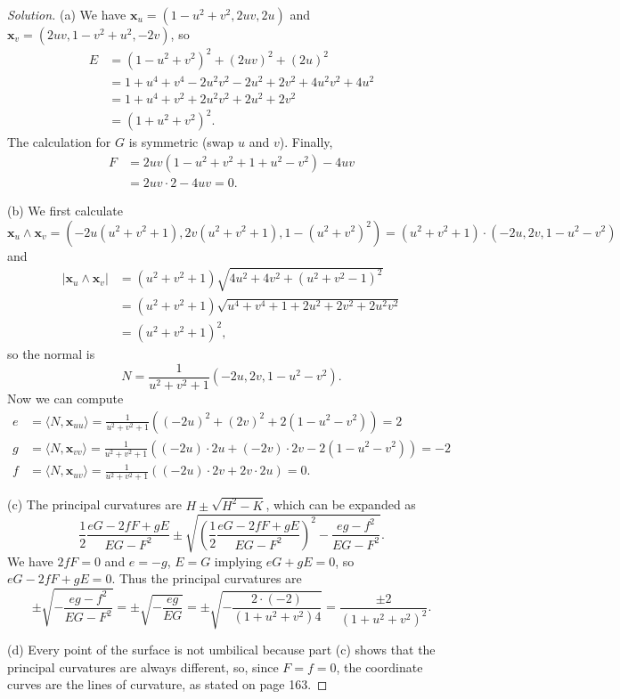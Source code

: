 \documentclass[10pt]{scrartcl}
\providecommand{\half}{\frac{1}{2}}
\providecommand{\mb}[1]{\mathbf{#1}}
\newenvironment{soln}{\begin{proof}[Solution]}{\end{proof}}
\begin{document}
\begin{soln}
	(a) We have $\mb x_u = (1-u^2+v^2,2uv,2u)$
	and $\mb x_v = (2uv,1-v^2+u^2,-2v)$, so
	\begin{align*}
		E &= (1-u^2+v^2)^2 + (2uv)^2 + (2u)^2\\
		&= 1+u^4+v^4-2u^2v^2-2u^2+2v^2+4u^2v^2+4u^2\\
		&= 1+u^4+v^2+2u^2v^2+2u^2+2v^2\\
		&= (1+u^2+v^2)^2.
	\end{align*}
	The calculation for $G$ is symmetric (swap $u$ and $v$). Finally,
	\begin{align*}
		F &= 2uv(1-u^2+v^2+1+u^2-v^2) - 4uv\\
		&= 2uv\cdot 2 - 4uv = 0.
	\end{align*}

	(b) We first calculate
	\[\mb x_u\wedge\mb x_v = (-2u(u^2+v^2+1), 2v(u^2+v^2+1),1-(u^2+v^2)^2)
	= (u^2+v^2+1)\cdot(-2u,2v,1-u^2-v^2)\]
	and
	\begin{align*}
		|\mb x_u\wedge\mb x_v|
		&= (u^2+v^2+1)\sqrt{4u^2+4v^2+(u^2+v^2-1)^2}\\
		&= (u^2+v^2+1)\sqrt{u^4+v^4+1+2u^2+2v^2+2u^2v^2}\\
		&= (u^2+v^2+1)^2,
	\end{align*}
	so the normal is
	\[N = \frac{1}{u^2+v^2+1}(-2u,2v,1-u^2-v^2).\]
	Now we can compute
	\begin{align*}
		e &= \langle N,\mb x_{uu}\rangle
		= \frac{1}{u^2+v^2+1}((-2u)^2 + (2v)^2 + 2(1-u^2-v^2)) = 2\\
		g &= \langle N,\mb x_{vv}\rangle
		= \frac{1}{u^2+v^2+1}((-2u)\cdot 2u + (-2v)\cdot 2v - 2(1-u^2-v^2))
		= -2\\
		f &= \langle N,\mb x_{uv}\rangle
		= \frac{1}{u^2+v^2+1}((-2u)\cdot 2v + 2v\cdot 2u) = 0.
	\end{align*}

	(c) The principal curvatures are $H\pm\sqrt{H^2-K}$,
	which can be expanded as
	\[\half\frac{eG-2fF+gE}{EG-F^2}\pm
	\sqrt{\left(\half\frac{eG-2fF+gE}{EG-F^2}\right)^2
	- \frac{eg-f^2}{EG-F^2}}.\]
	We have $2fF = 0$ and $e=-g$, $E=G$ implying $eG+gE=0$, so
	$eG-2fF+gE=0$. Thus the principal curvatures are
	\[\pm\sqrt{-\frac{eg-f^2}{EG-F^2}}
	= \pm\sqrt{-\frac{eg}{EG}}
	= \pm\sqrt{-\frac{2\cdot(-2)}{(1+u^2+v^2)4}}
	= \frac{\pm 2}{(1+u^2+v^2)^2}.\]
	
	(d) Every point of the surface is not umbilical
	because part (c) shows that the principal curvatures are always different,
	so, since $F = f = 0$, the coordinate curves are the lines of curvature,
	as stated on page 163.
	

\end{soln}
\end{document}
